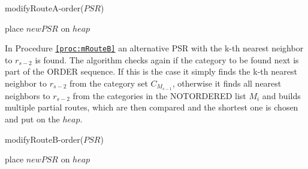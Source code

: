 \begin{procedure}[H]
\caption{modifyRouteA-order($PSR$)}
\label{proc:mRouteA}


	place $newPSR$ on $heap$\;
\end{procedure}

\vspace{\baselineskip}

In Procedure \texttt{\ref{proc:mRouteB}} an alternative PSR with the k-th nearest neighbor to $r_{s-2}$ is found. The algorithm checks again if the category to be found next is part of the ORDER sequence. If this is the case it simply finds the k-th nearest neighbor to $r_{s-2}$ from the category set $C_{M_{s-1}}$, otherwise it finds all nearest neighbors to $r_{s-2}$ from the categories in the NOTORDERED list $M_{i}$ and builds multiple partial routes, which are then compared and the shortest one is chosen and put on the $heap$. \newline

\begin{procedure}[H]
\caption{modifyRouteB-order($PSR$)}
\label{proc:mRouteB}
	
	

	place $newPSR$ on $heap$\;
\end{procedure}

